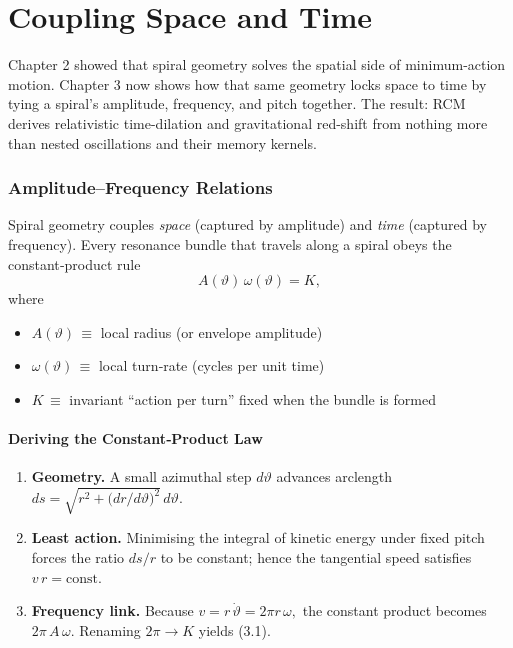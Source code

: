 \chapter{Coupling Space and Time}

Chapter 2 showed that spiral geometry solves the spatial side of minimum-action motion.
Chapter 3 now shows how that same geometry locks space to time by tying a spiral’s amplitude, frequency, and pitch together.
The result: RCM derives relativistic time-dilation and gravitational red-shift from nothing more than nested oscillations and their memory kernels.
\subsection{Amplitude–Frequency Relations}

Spiral geometry couples \emph{space} (captured by amplitude) and \emph{time} (captured by frequency).  Every resonance bundle that travels along a spiral obeys the constant‐product rule
\begin{equation}
  A(\vartheta)\,\omega(\vartheta)=K,
  \tag{3.1}
\end{equation}
where
\begin{itemize}
  \item \(A(\vartheta)\)\,\(\equiv\) local radius (or envelope amplitude)
  \item \(\omega(\vartheta)\)\,\(\equiv\) local turn‐rate (cycles per unit time)
  \item \(K\)\,\(\equiv\) invariant “action per turn” fixed when the bundle is formed
\end{itemize}

\medskip
\subsubsection{Deriving the Constant‐Product Law}

\begin{enumerate}
  \item \textbf{Geometry.} A small azimuthal step \(d\vartheta\) advances arclength  
    \(\displaystyle ds = \sqrt{r^{2} + \bigl(dr/d\vartheta\bigr)^{2}}\,d\vartheta.\)
  \item \textbf{Least action.} Minimising the integral of kinetic energy under fixed pitch forces the ratio \(ds/r\) to be constant; hence the tangential speed satisfies \(v\,r=\mathrm{const}.\)
  \item \textbf{Frequency link.} Because \(v=r\,\dot\vartheta=2\pi r\,\omega,\) the constant product becomes \(2\pi\,A\,\omega.\) Renaming \(2\pi\to K\) yields (3.1).
\end{enumerate}

